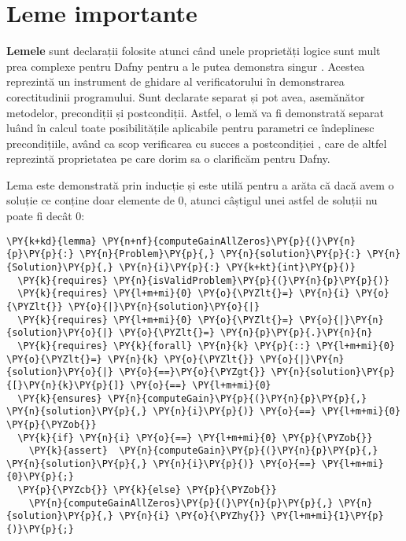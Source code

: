 \chapter{Leme importante}
\begin{sloppypar}

\textbf{Lemele} sunt declarații folosite atunci când unele proprietăți logice sunt mult prea complexe pentru Dafny pentru a le putea demonstra singur \cite{leino2021dafny}. Acestea reprezintă un instrument de ghidare al verificatorului în demonstrarea corectitudinii programului. Sunt declarate separat și pot avea, asemănător metodelor, precondiții și postcondiții. Astfel, o lemă va fi demonstrată separat luând în calcul toate posibilitățile aplicabile pentru parametri ce îndeplinesc precondițiile, având ca scop verificarea cu succes a postcondiției \cite{leino2021dafny}, care de altfel reprezintă proprietatea pe care dorim sa o clarificăm pentru Dafny. \par
Lema  este demonstrată prin inducție și este utilă pentru a arăta că dacă avem o soluție ce conține doar elemente de 0, atunci câștigul unei astfel de soluții nu poate fi decât 0: 
\begin{Verbatim}[commandchars=\\\{\}]
\PY{k+kd}{lemma} \PY{n+nf}{computeGainAllZeros}\PY{p}{(}\PY{n}{p}\PY{p}{:} \PY{n}{Problem}\PY{p}{,} \PY{n}{solution}\PY{p}{:} \PY{n}{Solution}\PY{p}{,} \PY{n}{i}\PY{p}{:} \PY{k+kt}{int}\PY{p}{)}
  \PY{k}{requires} \PY{n}{isValidProblem}\PY{p}{(}\PY{n}{p}\PY{p}{)}
  \PY{k}{requires} \PY{l+m+mi}{0} \PY{o}{\PYZlt{}=} \PY{n}{i} \PY{o}{\PYZlt{}} \PY{o}{|}\PY{n}{solution}\PY{o}{|}
  \PY{k}{requires} \PY{l+m+mi}{0} \PY{o}{\PYZlt{}=} \PY{o}{|}\PY{n}{solution}\PY{o}{|} \PY{o}{\PYZlt{}=} \PY{n}{p}\PY{p}{.}\PY{n}{n} 
  \PY{k}{requires} \PY{k}{forall} \PY{n}{k} \PY{p}{::} \PY{l+m+mi}{0} \PY{o}{\PYZlt{}=} \PY{n}{k} \PY{o}{\PYZlt{}} \PY{o}{|}\PY{n}{solution}\PY{o}{|} \PY{o}{==}\PY{o}{\PYZgt{}} \PY{n}{solution}\PY{p}{[}\PY{n}{k}\PY{p}{]} \PY{o}{==} \PY{l+m+mi}{0}
  \PY{k}{ensures} \PY{n}{computeGain}\PY{p}{(}\PY{n}{p}\PY{p}{,} \PY{n}{solution}\PY{p}{,} \PY{n}{i}\PY{p}{)} \PY{o}{==} \PY{l+m+mi}{0}
\PY{p}{\PYZob{}}
  \PY{k}{if} \PY{n}{i} \PY{o}{==} \PY{l+m+mi}{0} \PY{p}{\PYZob{}}
    \PY{k}{assert}  \PY{n}{computeGain}\PY{p}{(}\PY{n}{p}\PY{p}{,} \PY{n}{solution}\PY{p}{,} \PY{n}{i}\PY{p}{)} \PY{o}{==} \PY{l+m+mi}{0}\PY{p}{;}
  \PY{p}{\PYZcb{}} \PY{k}{else} \PY{p}{\PYZob{}}
    \PY{n}{computeGainAllZeros}\PY{p}{(}\PY{n}{p}\PY{p}{,} \PY{n}{solution}\PY{p}{,} \PY{n}{i} \PY{o}{\PYZhy{}} \PY{l+m+mi}{1}\PY{p}{)}\PY{p}{;}

\end{Verbatim}
\end{sloppypar}
